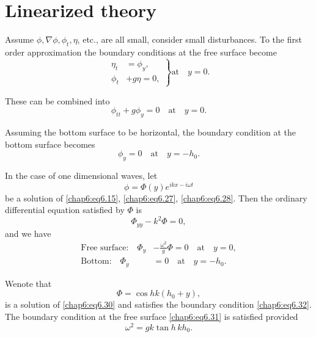 \section{Linearized theory}\label{chap6:sec6.2}

Assume $\phi,\nabla\phi,\phi_t,\eta$, etc., are all small, \ie consider small disturbances. To the first order approximation the boundary conditions at the free surface become
\begin{equation}
\left.
\begin{aligned}
\eta_t&=\phi_y,\\
\phi_t&+g\eta=0,
\end{aligned}
\right\}\text{at}\quad y=0.\tag{6.26}\label{chap6:eq6.26}
\end{equation}

These can be combined into
\begin{equation}
\phi_{tt}+g\phi_y=0\quad\text{at}\quad y=0.\tag{6.27}\label{chap6:eq6.27}
\end{equation}

Assuming the bottom surface to be horizontal, the boundary condition at the bottom surface becomes
\begin{equation}
\phi_y=0\quad\text{at}\quad y= -h_0.\tag{6.28}\label{chap6:eq6.28}
\end{equation}

In the case of one dimensional waves, let
\begin{equation}
\phi=\Phi(y)e^{ikx-i\omega t}\tag{6.29}\label{chap6:eq6.29}
\end{equation}
be a solution of \eqref{chap6:eq6.15}, \eqref{chap6:eq6.27}, \eqref{chap6:eq6.28}. Then the ordinary differential equation satisfied by $\Phi$ is 
\begin{equation}
\Phi_{yy}-k^2\Phi=0,\tag{6.30}\label{chap6:eq6.30}
\end{equation}
and we have
\begin{align}
\text{Free surface:}\quad \Phi_y &-\frac{\omega^2}{g}\Phi=0\quad\text{at}\quad y=0,\tag{6.31}\label{chap6:eq6.31}\\
\text{Bottom:}\quad \Phi_y &=0\quad\text{at}\quad y=-h_0. \tag{6.32}\label{chap6:eq6.32}
\end{align}

We\pageoriginale note that
\begin{equation}
\Phi=\cos h k\left(h_0+y\right),\tag{6.33}\label{chap6:eq6.33}
\end{equation}
is a solution of \eqref{chap6:eq6.30} and satisfies the boundary condition \eqref{chap6:eq6.32}. The boundary condition at the free surface \eqref{chap6:eq6.31} is satisfied provided
\begin{equation}
\omega^2=gk\tan h \,kh_0.\tag{6.34}\label{chap6:eq6.34}
\end{equation}

